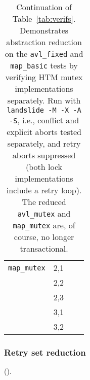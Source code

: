 \begin{table}[h]
\begin{center}
\begin{tabular}{cc||r|r}
			\cline{1-4}
			{\tt map\_mutex}
			& 2,1 & \\ %
			& 2,2 & \\ %
			& 2,3 & \\ %
			& 3,1 & \\ %
			& 3,2 & \\ %
		\end{tabular}
	\end{center}
	\caption{Continuation of Table~\ref{tab:verifs}.
		Demonstrates abstraction reduction \cite{dbug-phdthesis}
		on the {\tt avl\_fixed} and {\tt map\_basic} tests
		by verifying HTM mutex implementations separately.
		Run with {\tt landslide -M -X -A -S}, i.e.,
		conflict and explicit aborts tested separately,
		and retry aborts suppressed
		(both lock implementations include a retry loop).
		The reduced {\tt avl\_mutex} and {\tt map\_mutex} are, of course, no longer transactional.
		}
	\label{tab:verifs2}
\end{table}

\subsubsection{Retry set reduction}
\label{sec:tm-eval-retrysets}


(\sect{\ref{sec:tm-retrysets}}).


